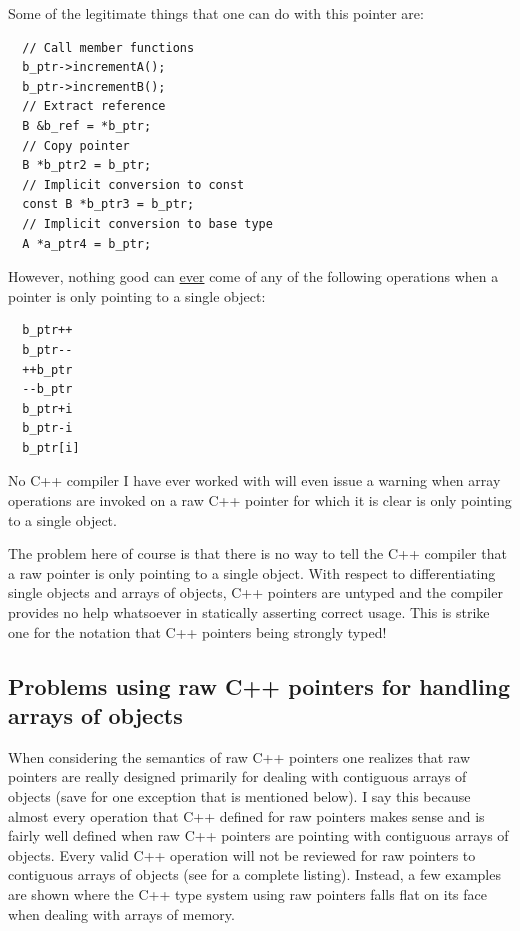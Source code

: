 \documentclass[pdf,ps2pdf,11pt]{SANDreport}
\begin{document}
Some of the legitimate things that one can do with this pointer are:

{\small\begin{verbatim}
  // Call member functions
  b_ptr->incrementA();
  b_ptr->incrementB();
  // Extract reference
  B &b_ref = *b_ptr;
  // Copy pointer
  B *b_ptr2 = b_ptr;
  // Implicit conversion to const
  const B *b_ptr3 = b_ptr;
  // Implicit conversion to base type
  A *a_ptr4 = b_ptr;
\end{verbatim}}

However, nothing good can {}\underline{ever} come of any of the
following operations when a pointer is only pointing to a single
object:

{\small\begin{verbatim}
  b_ptr++
  b_ptr--
  ++b_ptr
  --b_ptr
  b_ptr+i
  b_ptr-i
  b_ptr[i]
\end{verbatim}}

No C++ compiler I have ever worked with will even issue a warning when
array operations are invoked on a raw C++ pointer for which it is
clear is only pointing to a single object.

The problem here of course is that there is no way to tell the C++
compiler that a raw pointer is only pointing to a single object.  With
respect to differentiating single objects and arrays of objects, C++
pointers are untyped and the compiler provides no help whatsoever in
statically asserting correct usage.  This is strike one for the
notation that C++ pointers being strongly typed!


%
{}\subsection{Problems using raw C++ pointers for handling arrays of
objects}
\label{sec:problem-with-raw-array-pointers}
%

When considering the semantics of raw C++ pointers one realizes that
raw pointers are really designed primarily for dealing with contiguous
arrays of objects (save for one exception that is mentioned below).  I
say this because almost every operation that C++ defined for raw
pointers makes sense and is fairly well defined when raw C++ pointers
are pointing with contiguous arrays of objects.  Every valid C++
operation will not be reviewed for raw pointers to contiguous arrays
of objects (see {}\cite{stroustrup97} for a complete listing).
Instead, a few examples are shown where the C++ type system using raw
pointers falls flat on its face when dealing with arrays of memory.
\end{document}
